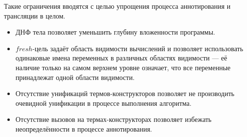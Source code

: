 Такие ограничения вводятся с целью упрощения процесса аннотирования и трансляции в целом.
\begin{itemize}
    \item ДНФ тела позволяет уменьшить глубину вложенности программы.
    \item $fresh$-цель задаёт область видимости вычислений и позволяет использовать одинаковые имена переменных в различных областях видимости --- её наличие только на самом верхнем уровне означает, что все переменные принадлежат одной области видимости.
    \item Отсутствие унификаций термов-конструкторов позволяет не производить очевидной унификации в процессе выполнения алгоритма.
    \item Отсутствие вызовов на термах-конструкторах позволяет избежать неопределённости в процессе аннотирования.
\end{itemize}
